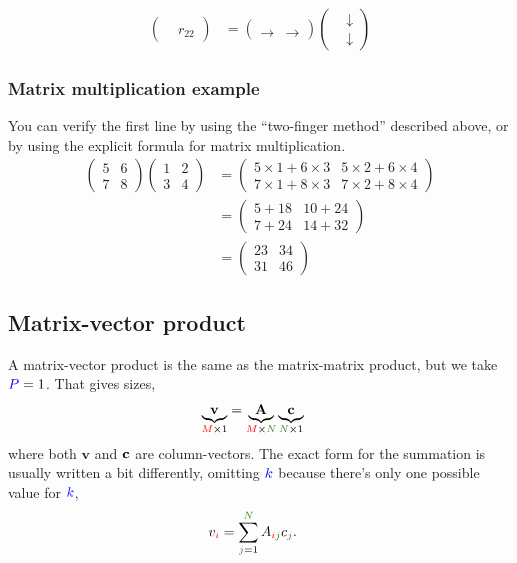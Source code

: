 \documentclass{article}
\newcommand{\A}{\mathbf{A}}
\begin{document}
\begin{align}
  \begin{pmatrix}
      & \\
      & r_{22}
  \end{pmatrix} &= 
  \begin{pmatrix}
  & \\
   \rightarrow & \rightarrow 
  \end{pmatrix}
  \begin{pmatrix}
    & \downarrow \\
    & \downarrow 
  \end{pmatrix}
\end{align}

\subsubsection{Matrix multiplication example}
You can verify the first line by using the ``two-finger method'' described above, or by using the explicit formula for matrix multiplication.
\begin{align}
  \begin{pmatrix}
    5 & 6 \\
    7 & 8
  \end{pmatrix}
  \begin{pmatrix}
    1 & 2 \\
    3 & 4
  \end{pmatrix}
  &= 
  \begin{pmatrix}
    5 \times 1 + 6 \times 3 & 5 \times 2 + 6 \times 4\\
    7 \times 1 + 8 \times 3 & 7 \times 2 + 8 \times 4
  \end{pmatrix}\\
  &= 
  \begin{pmatrix}
    5 + 18 & 10 + 24\\
    7 + 24 & 14 + 32
  \end{pmatrix}\\
  &=
  \begin{pmatrix}
    23 & 34\\
    31 & 46
  \end{pmatrix}
\end{align}



\subsection{Matrix-vector product}
A matrix-vector product is the same as the matrix-matrix product, but we take $\P=1$.
That gives sizes,
\begin{align}
  \underbrace{\mathbf{v}}_{\M \times 1} &= \underbrace{\A}_{\M \times \N} \underbrace{\c}_{\N \times 1}
\end{align}
where both $\mathbf{v}$ and $\c$ are column-vectors.
The exact form for the summation is usually written a bit differently, omitting $\k$ because there's only one possible value for $\k$,
\begin{align}
  v_{\i} &= \sum_{\j=1}^{\N} A_{\i\j} c_{\j}.
\end{align}
\end{document}
